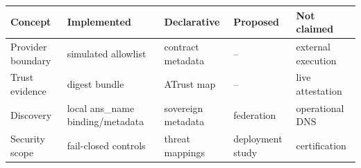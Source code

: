 \begin{tabularx}{\textwidth}{@{}XXXXX@{}}
\toprule
Concept & Implemented & Declarative & Proposed & Not claimed \\
\midrule
Provider boundary & simulated allowlist & contract metadata & -- & external execution \\
Trust evidence & digest bundle & ATrust map & -- & live attestation \\
Discovery & local ans\_name binding/metadata & sovereign metadata & federation & operational DNS \\
Security scope & fail-closed controls & threat mappings & deployment study & certification \\
\bottomrule
\end{tabularx}
